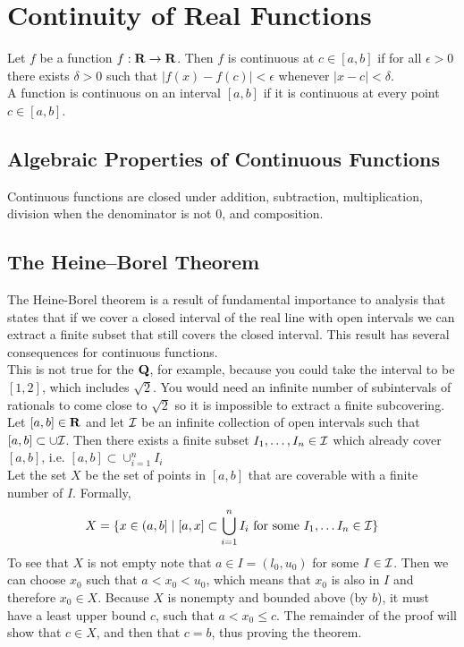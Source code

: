 \section{Continuity of Real Functions}
  Let $f$ be a function $f:\mathbf{R} \to \mathbf{R}$. Then $f$ is continuous at $c \in [a,b]$ if
  for all $\epsilon > 0$ there exists $\delta > 0$ such that $|f(x) - f(c)| < \epsilon$
  whenever $|x-c| < \delta$.\\

  A function is continuous on an interval $[a,b]$ if it is continuous at every point 
  $c \in [a,b]$.

  \subsection{Algebraic Properties of Continuous Functions}
    Continuous functions are closed under addition, subtraction, multiplication,
    division when the denominator is not 0, and composition.\\

  \subsection{The Heine--Borel Theorem}
    The Heine-Borel theorem is a result of fundamental importance to analysis that states that
    if we cover a closed interval of the real line with open intervals we can extract a finite 
    subset that still covers the closed interval. This result has several consequences for 
    continuous functions.\\

    This is not true for the $\mathbf{Q}$, for example, because you could take the interval to
    be $[1,2]$, which includes $\sqrt{2}$. You would need an infinite number of subintervals of
    rationals to come close to $\sqrt{2}$ so it is impossible to extract a finite subcovering.\\

    \thm Let $[a,b] \in \mathbf{R}$ and let $\cal{I}$ be an infinite collection of open intervals 
    such that  $[a,b] \subset \cup \cal I$. Then there exists a finite subset $I_1, \ldots, I_n 
    \in \cal I$ which 
    already cover $[a,b]$, i.e. $[a,b] \subset \cup_{i=1}^n I_i$\\
  
    \pf Let the set $X$ be the set of points in $[a,b]$ that are coverable with a finite number 
    of $I$. Formally,
    \begin{align*}
      X = \{ x \in (a,b] \mid [a,x] \subset \bigcup_{i=1}^n I_i \text{ for some } I_1, \ldots
      I_n \in \cal I \}
    \end{align*}
    To see that $X$ is not empty note that $a \in I = (l_0,u_0)$ for some $I \in \cal I$. Then we
    can choose $x_0$ such that $a < x_0 < u_0$, which means that $x_0$ is also in $I$ and 
    therefore $x_0 \in X$. Because $X$ is nonempty and bounded above (by $b$), it must have 
    a least upper bound $c$, such that $a < x_0 \leq c$. The remainder of the proof will show
    that $c \in X$, and then that $c = b$, thus proving the theorem.\\

